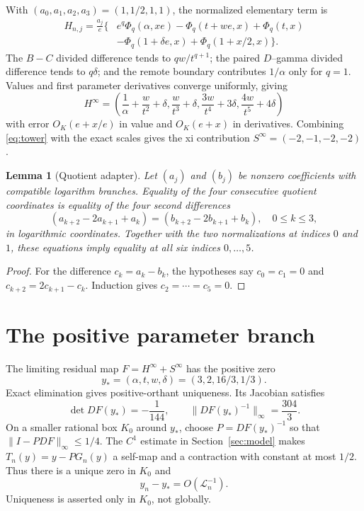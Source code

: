 \documentclass[11pt]{article}
\newtheorem{lemma}[theorem]{Lemma}
\theoremstyle{definition}
\theoremstyle{remark}
\newcommand{\cL}{\mathcal L}
\begin{document}
With $(a_0,a_1,a_2,a_3)=(1,1/2,1,1)$, the normalized elementary term is
\begin{align*}
H_{n,j}=\frac{a_j}{e}\{&e^q\Phi_q(\alpha,xe)
-\Phi_q(t+we,x)+\Phi_q(t,x)\\
&-\Phi_q(1+\delta e,x)+\Phi_q(1+x/2,x)\}.
\end{align*}
The $B-C$ divided difference tends to $qw/t^{q+1}$; the paired $D$--gamma
divided difference tends to $q\delta$; and the remote boundary contributes
$1/\alpha$ only for $q=1$.  Values and first parameter derivatives converge
uniformly, giving
\[
H^\infty=\left(
\frac1\alpha+\frac w{t^2}+\delta,
\frac w{t^3}+\delta,
\frac{3w}{t^4}+3\delta,
\frac{4w}{t^5}+4\delta\right)
\]
with error $O_K(e+x/e)$ in value and $O_K(e+x)$ in derivatives.
Combining \eqref{eq:tower} with the exact scales gives the xi contribution
$S^\infty=(-2,-1,-2,-2)$.

\begin{lemma}[Quotient adapter]\label{lem:quotient}
Let $(a_j)$ and $(b_j)$ be nonzero coefficients with compatible logarithm
branches.  Equality of the four consecutive quotient coordinates is equality
of the four second differences
\[
 (a_{k+2}-2a_{k+1}+a_k)=(b_{k+2}-2b_{k+1}+b_k),\quad0\le k\le3,
\]
in logarithmic coordinates.  Together with the two normalizations at indices
$0$ and $1$, these equations imply equality at all six indices $0,\ldots,5$.
\end{lemma}

\begin{proof}
For the difference $c_k=a_k-b_k$, the hypotheses say $c_0=c_1=0$ and
$c_{k+2}=2c_{k+1}-c_k$.  Induction gives $c_2=\cdots=c_5=0$.
\end{proof}

\section{The positive parameter branch}\label{sec:branch}

The limiting residual map $F=H^\infty+S^\infty$ has the positive zero
\[
 y_*=(\alpha,t,w,\delta)=(3,2,16/3,1/3).
\]
Exact elimination gives positive-orthant uniqueness.  Its Jacobian satisfies
\[
 \det DF(y_*)=-\frac1{144},\qquad
 \|DF(y_*)^{-1}\|_\infty=\frac{304}{3}.
\]
On a smaller rational box $K_0$ around $y_*$, choose
$P=DF(y_*)^{-1}$ so that $\|I-PDF\|_\infty\le1/4$.  The $C^1$ estimate in
Section~\ref{sec:model} makes $T_n(y)=y-PG_n(y)$ a self-map and a contraction
with constant at most $1/2$.  Thus there is a unique zero in $K_0$ and
\[
 y_n-y_*=O(\cL_n^{-1}).
\]
Uniqueness is asserted only in $K_0$, not globally.
\end{document}
